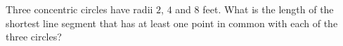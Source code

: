Three concentric circles have radii $2$, $4$ and $8$ feet. What is the length of the shortest line segment that has at least one point in common with each of the three circles?
